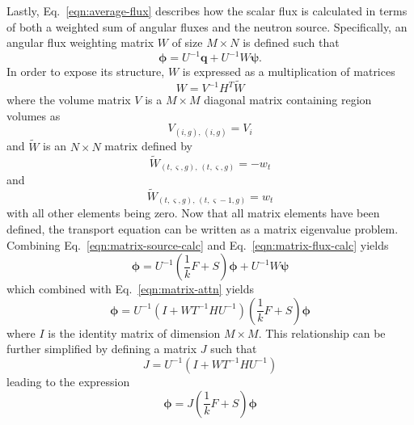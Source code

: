 Lastly, Eq.~\ref{eqn:average-flux} describes how the scalar flux is calculated in terms of both a weighted sum of angular fluxes and the neutron source. Specifically, an angular flux weighting matrix $W$ of size $M \times N$ is defined such that
\begin{equation}
\boldsymbol{\phi} = U^{-1}\mathbf{q} + U^{-1} W \boldsymbol{\psi}.
\label{eqn:matrix-flux-calc}
\end{equation}
In order to expose its structure, $W$ is expressed as a multiplication of matrices
\begin{equation}
W = V^{-1} H^T \tilde{W}
\end{equation}
where the volume matrix $V$ is a $M \times M$ diagonal matrix containing region volumes as
\begin{equation}
V_{\left(i, g\right), \, \left(i, g\right)} = V_i
\end{equation}
and $\tilde{W}$ is an $N \times N$ matrix defined by
\begin{equation}
\tilde{W}_{\left(t,\varsigma,g\right), \, \left(t, \varsigma, g\right)} = -w_{t}
\end{equation}
and
\begin{equation}
\tilde{W}_{\left(t,\varsigma,g\right), \, \left(t, \varsigma-1, g\right)} = w_{t}
\end{equation}
with all other elements being zero. Now that all matrix elements have been defined, the transport equation can be written as a matrix eigenvalue problem. Combining Eq.~\ref{eqn:matrix-source-calc} and Eq.~\ref{eqn:matrix-flux-calc} yields
\begin{equation}
\boldsymbol{\phi} = U^{-1} \left(\frac{1}{k} F + S \right) \boldsymbol{\phi} + U^{-1} W \boldsymbol{\psi}
\end{equation}
which combined with Eq.~\ref{eqn:matrix-attn} yields
\begin{equation}
\boldsymbol{\phi} = U^{-1}\left( I + W T^{-1} H U^{-1}\right) \left(\frac{1}{k} F + S \right) \boldsymbol{\phi}
\label{eqn:moc-matrix-form}
\end{equation}
where $I$ is the identity matrix of dimension $M \times M$. This relationship can be further simplified by defining a matrix $J$ such that
\begin{equation}
J = U^{-1}\left( I + W T^{-1} H U^{-1}\right)
\end{equation}
leading to the expression
\begin{equation}
\boldsymbol{\phi} = J \left(\frac{1}{k} F + S \right) \boldsymbol{\phi}
\label{eq:app-transport-simplified}
\end{equation}
